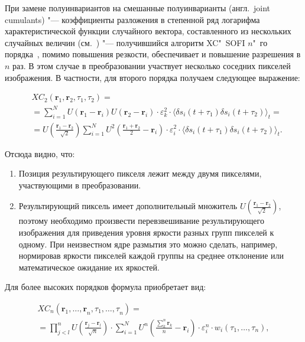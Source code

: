 При замене полуинвариантов на смешанные полуинварианты (англ.~joint cumulants) "--- коэффициенты разложения в степенной ряд логарифма характеристической функции случайного вектора, составленного из нескольких случайных величин (см.~\cite{малахов1978кумулянтный}) "--- получившийся алгоритм XC"~SOFI $n$"~го порядка~\cite{dertinger2010achieving}, помимо повышения резкости, обеспечивает и повышение разрешения в $n$ раз. В этом случае в преобразовании участвует несколько соседних пикселей изображения. В частности, для второго порядка получаем следующее выражение:

\begin{align*}
	&{XC}_2\left(\mathbf{r}_1,\mathbf{r}_2,\tau_1,\tau_2\right) = \\
	&= \sum_{i=1}^{N} {U\left(\mathbf{r}_1-\mathbf{r}_i\right)U\left(\mathbf{r}_2-\mathbf{r}_i\right)\cdot\varepsilon_k^2\cdot \langle \delta s_i\left(t+\tau_1\right)\delta s_i\left(t+\tau_2\right) \rangle_t} = \\
	&= U\left(\frac{\mathbf{r}_1-\mathbf{r}_2}{\sqrt2}\right) \sum_{i=1}^{N} {U^2\left(\frac{\mathbf{r}_1+\mathbf{r}_2}{2}-\mathbf{r}_i\right)\cdot\varepsilon_i^2\cdot \langle \delta s_i\left(t+\tau_1\right)\delta s_i\left(t+\tau_2\right) \rangle_t}.
\end{align*}

Отсюда видно, что:
\begin{enumerate}[beginpenalty=10000]
	\item Позиция результирующего пикселя лежит между двумя пикселями, участвующими в преобразовании.
	\item Результирующий пиксель имеет дополнительный множитель $U\left(\frac{\mathbf{r}_1-\mathbf{r}_2}{\sqrt2}\right)$, поэтому необходимо произвести перевзвешивание результирующего изображения для приведения уровня яркости разных групп пикселей к одному. При неизвестном ядре размытия это можно сделать, например, нормировав яркости пикселей каждой группы на среднее отклонение или математическое ожидание их яркостей.
\end{enumerate}

Для более высоких порядков формула приобретает вид:	

\begin{equation*}
	\begin{multlined}
		{XC}_n\left(\mathbf{r}_1,{\ldots,\mathbf{r}}_n,\tau_1,{\ldots,\tau}_n \right) = \\
		= \prod_{j<l}^{n}{U\left(\frac{\mathbf{r}_j-\mathbf{r}_l}{\sqrt n}\right)} \cdot \sum_{i=1}^{N}{U^n\left(\frac{\sum_{k}^{n}\mathbf{r}_k}{n}-\mathbf{r}_i \right)\cdot\varepsilon_i^n\cdot w_i(\tau_1,\ldots,\tau_n)},
	\end{multlined}
\end{equation*}

